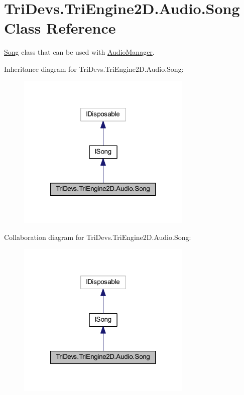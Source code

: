 \hypertarget{class_tri_devs_1_1_tri_engine2_d_1_1_audio_1_1_song}{\section{Tri\-Devs.\-Tri\-Engine2\-D.\-Audio.\-Song Class Reference}
\label{class_tri_devs_1_1_tri_engine2_d_1_1_audio_1_1_song}
}


\hyperlink{class_tri_devs_1_1_tri_engine2_d_1_1_audio_1_1_song}{Song} class that can be used with \hyperlink{class_tri_devs_1_1_tri_engine2_d_1_1_audio_1_1_audio_manager}{Audio\-Manager}.  




Inheritance diagram for Tri\-Devs.\-Tri\-Engine2\-D.\-Audio.\-Song\-:\nopagebreak
\begin{figure}[H]
\begin{center}
\leavevmode
\includegraphics[width=236pt]{class_tri_devs_1_1_tri_engine2_d_1_1_audio_1_1_song__inherit__graph}
\end{center}
\end{figure}


Collaboration diagram for Tri\-Devs.\-Tri\-Engine2\-D.\-Audio.\-Song\-:\nopagebreak
\begin{figure}[H]
\begin{center}
\leavevmode
\includegraphics[width=236pt]{class_tri_devs_1_1_tri_engine2_d_1_1_audio_1_1_song__coll__graph}
\end{center}
\end{figure}
